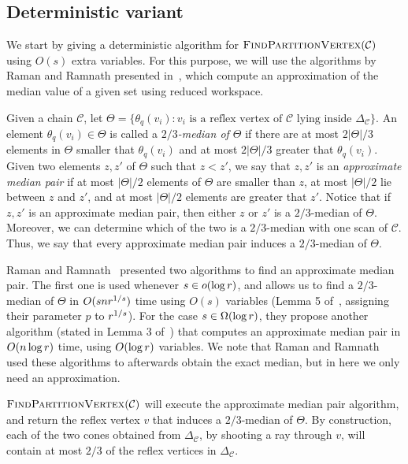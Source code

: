 \documentclass[a4paper]{article}
\newcommand{\coneC}{\ensuremath{{{\Delta_{\mathcal C}}}}}
\newcommand{\C}{\ensuremath{{\mathcal C}}}
\begin{document}
\subsection{Deterministic variant}\label{secdeter}

We start by giving a deterministic algorithm for $\textsc{FindPartitionVertex}(\mathcal C)$ using $O(s)$ extra variables. For this purpose, we will use the algorithms by Raman and Ramnath presented in~\cite{rr-iubtstsls-98}, which compute an approximation of the median value of a given set using reduced workspace.

Given a chain $\C$, let $\Theta = \{\theta_q(v_i) : v_i\text{ is a reflex vertex of $\C$ lying inside }\coneC\}$. An element $\theta_q(v_i)\in \Theta$ is called a \emph{$2/3$-median of $\Theta$} if there are at most $2|\Theta|/3$ elements in $\Theta$ smaller that $\theta_q(v_i)$ and at most $2|\Theta|/3$ greater that $\theta_q(v_i)$.
Given two elements $z,z'$ of $\Theta$ such that $z<z'$, we say that $z,z'$ is an \emph{approximate median pair} if at most $|\Theta|/2$ elements of $\Theta$ are smaller than $z$, at most $|\Theta|/2$ lie between $z$ and $z'$, and at most $|\Theta|/2$ elements are greater that $z'$.
Notice that if $z,z'$ is an approximate median pair, then either $z$ or $z'$ is a $2/3$-median of $\Theta$.
Moreover, we can determine which of the two is a $2/3$-median with one scan of $\C$. Thus, we say that every approximate median pair induces a $2/3$-median of $\Theta$.

Raman and Ramnath~\cite{rr-iubtstsls-98} presented two algorithms to find an approximate median pair. The first one is used whenever $s\in o(\log r)$, and allows us to find a $2/3$-median of $\Theta$ in $O(snr^{1/s})$ time using $O(s)$ variables (Lemma 5 of~\cite{rr-iubtstsls-98}, assigning their parameter $p$ to $r^{1/s}$). For the case $s\in \Omega(\log r)$, they propose another algorithm (stated in Lemma 3 of~\cite{rr-iubtstsls-98}) that computes an approximate median pair in $O(n\log r)$ time, using $O(\log r)$ variables. We note that Raman and Ramnath used these algorithms to afterwards obtain the exact median, but in here we only need an approximation. 

$\textsc{FindPartitionVertex}(\mathcal C)$ will execute the approximate median pair algorithm, and return the reflex vertex $v$ that induces a $2/3$-median of $\Theta$. By construction, each of the two cones obtained from $\coneC$, by shooting a ray through $v$, will contain at most $2/3$ of the reflex vertices in $\coneC$. 
\end{document}
